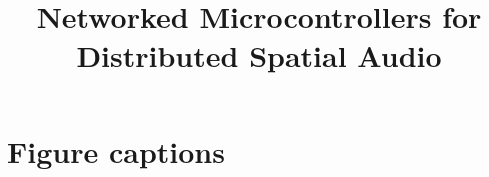 \documentclass[utf8]{FrontiersinHarvard}
\begin{document}
    \onecolumn

    \title[Networked Microcontrollers for Distributed Spatial Audio]
    {Networked Microcontrollers for Distributed Spatial Audio}

    \author[\firstAuthorLast ]{\Authors} %
    \address{} %
    \correspondance{} %

    \extraAuth{}%


    \maketitle


    
    
    
    
    

    


    
    


    \section*{Figure captions}

\end{document}
